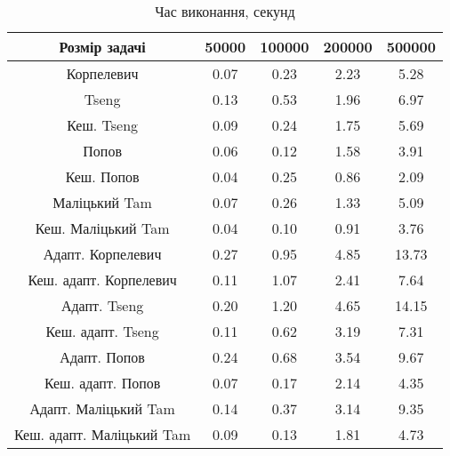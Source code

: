 \begin{table}[H]
	\centering
	\begin{tabular}{|c||c|c|c|c|}\hline
		Розмір задачі & 50000 & 100000 & 200000 & 500000 \\ \hline \hline
		Корпелевич & 0.07 & 0.23 & 2.23 & 5.28 \\ \hline
		Tseng & 0.13 & 0.53 & 1.96 & 6.97 \\ \hline
		Кеш. Tseng & 0.09 & 0.24 & 1.75 & 5.69 \\ \hline
		Попов & 0.06 & 0.12 & 1.58 & 3.91 \\ \hline
		Кеш. Попов & 0.04 & 0.25 & 0.86 & 2.09 \\ \hline
		Маліцький Tam & 0.07 & 0.26 & 1.33 & 5.09 \\ \hline
		Кеш. Маліцький Tam & 0.04 & 0.10 & 0.91 & 3.76 \\ \hline \hline
		Адапт. Корпелевич & 0.27 & 0.95 & 4.85 & 13.73 \\ \hline
		Кеш. адапт. Корпелевич & 0.11 & 1.07 & 2.41 & 7.64 \\ \hline
		Адапт. Tseng & 0.20 & 1.20 & 4.65 & 14.15 \\ \hline
		Кеш. адапт. Tseng & 0.11 & 0.62 & 3.19 & 7.31 \\ \hline
		Адапт. Попов & 0.24 & 0.68 & 3.54 & 9.67 \\ \hline
		Кеш. адапт. Попов & 0.07 & 0.17 & 2.14 & 4.35 \\ \hline
		Адапт. Маліцький Tam & 0.14 & 0.37 & 3.14 & 9.35 \\ \hline
		Кеш. адапт. Маліцький Tam & 0.09 & 0.13 & 1.81 & 4.73 \\ \hline
	\end{tabular}
	\caption{Час виконання, секунд}
\end{table}

